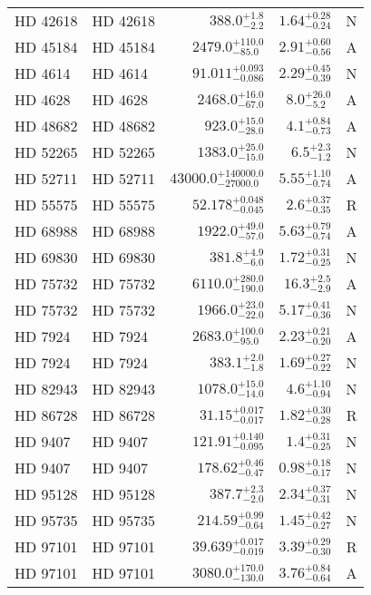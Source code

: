 \begin{longtable*}{llrrr}
HD 42618 & HD 42618 & $388.0^{+1.8}_{-2.2}$ & $1.64^{+0.28}_{-0.24}$ & N \\ 
HD 45184 & HD 45184 & $2479.0^{+110.0}_{-85.0}$ & $2.91^{+0.60}_{-0.56}$ & A \\ 
HD 4614 & HD 4614 & $91.011^{+0.093}_{-0.086}$ & $2.29^{+0.45}_{-0.39}$ & N \\ 
HD 4628 & HD 4628 & $2468.0^{+16.0}_{-67.0}$ & $8.0^{+26.0}_{-5.2}$ & A \\ 
HD 48682 & HD 48682 & $923.0^{+15.0}_{-28.0}$ & $4.1^{+0.84}_{-0.73}$ & A \\ 
HD 52265 & HD 52265 & $1383.0^{+25.0}_{-15.0}$ & $6.5^{+2.3}_{-1.2}$ & N \\ 
HD 52711 & HD 52711 & $43000.0^{+140000.0}_{-27000.0}$ & $5.55^{+1.10}_{-0.74}$ & A \\ 
HD 55575 & HD 55575 & $52.178^{+0.048}_{-0.045}$ & $2.6^{+0.37}_{-0.35}$ & R \\ 
HD 68988 & HD 68988 & $1922.0^{+49.0}_{-57.0}$ & $5.63^{+0.79}_{-0.74}$ & A \\ 
HD 69830 & HD 69830 & $381.8^{+4.9}_{-6.0}$ & $1.72^{+0.31}_{-0.25}$ & N \\ 
HD 75732 & HD 75732 & $6110.0^{+280.0}_{-190.0}$ & $16.3^{+2.5}_{-2.9}$ & A \\ 
HD 75732 & HD 75732 & $1966.0^{+23.0}_{-22.0}$ & $5.17^{+0.41}_{-0.36}$ & N \\ 
HD 7924 & HD 7924 & $2683.0^{+100.0}_{-95.0}$ & $2.23^{+0.21}_{-0.20}$ & A \\ 
HD 7924 & HD 7924 & $383.1^{+2.0}_{-1.8}$ & $1.69^{+0.27}_{-0.22}$ & N \\ 
HD 82943 & HD 82943 & $1078.0^{+15.0}_{-14.0}$ & $4.6^{+1.10}_{-0.94}$ & N \\ 
HD 86728 & HD 86728 & $31.15^{+0.017}_{-0.017}$ & $1.82^{+0.30}_{-0.28}$ & R \\ 
HD 9407 & HD 9407 & $121.91^{+0.140}_{-0.095}$ & $1.4^{+0.31}_{-0.25}$ & N \\ 
HD 9407 & HD 9407 & $178.62^{+0.46}_{-0.47}$ & $0.98^{+0.18}_{-0.17}$ & N \\ 
HD 95128 & HD 95128 & $387.7^{+2.3}_{-2.0}$ & $2.34^{+0.37}_{-0.31}$ & N \\ 
HD 95735 & HD 95735 & $214.59^{+0.99}_{-0.64}$ & $1.45^{+0.42}_{-0.27}$ & N \\ 
HD 97101 & HD 97101 & $39.639^{+0.017}_{-0.019}$ & $3.39^{+0.29}_{-0.30}$ & R \\ 
HD 97101 & HD 97101 & $3080.0^{+170.0}_{-130.0}$ & $3.76^{+0.84}_{-0.64}$ & A \\ 

\end{longtable*}
